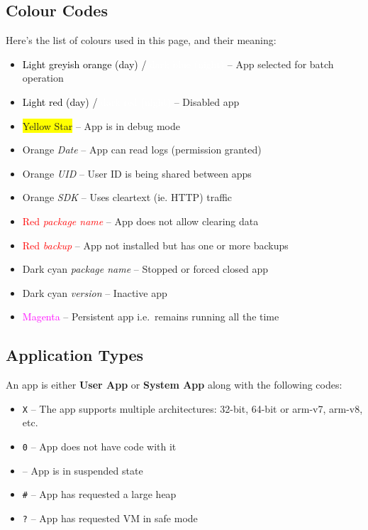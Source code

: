 \subsection{Colour Codes}\label{subsec:main-colour-codes}
Here's the list of colours used in this page, and their meaning:
\begin{itemize}
    \item \colorbox{AMLightGreyishOrange}{\textcolor{black}{Light greyish orange (day)}} / \colorbox{AMDarkBlue}{
        \textcolor{white}{dark blue (night)}} -- App selected for batch operation
    \item \colorbox{AMLightRed}{\textcolor{black}{Light red (day)}} / \colorbox{AMVeryDarkRed}{
        \textcolor{white}{dark red (night)}} -- Disabled app
    \item \colorbox{yellow}{Yellow Star} -- App is in debug mode
    \item \textcolor{AMOrange}{Orange \textit{Date}} -- App can read logs (permission granted)
    \item \textcolor{AMOrange}{Orange \textit{UID}} -- User ID is being shared between apps
    \item \textcolor{AMOrange}{Orange \textit{SDK}} -- Uses cleartext (ie. HTTP) traffic
    \item \textcolor{red}{Red \textit{package name}} -- App does not allow clearing data
    \item \textcolor{red}{Red \textit{backup}} -- App not installed but has one or more backups
    \item \textcolor{AMDarkCyan}{Dark cyan \textit{package name}} -- Stopped or forced closed app
    \item \textcolor{AMDarkCyan}{Dark cyan \textit{version}} -- Inactive app
    \item \textcolor{magenta}{Magenta} -- Persistent app i.e.\ remains running all the time
\end{itemize}

\subsection{Application Types}\label{subsec:main-page-application-types}
An app is either \textbf{User App} or \textbf{System App} along with the following codes:
\begin{itemize}
    \item \texttt{X} -- The app supports multiple architectures: 32-bit, 64-bit or arm-v7, arm-v8, etc.
    \item \texttt{0} -- App does not have code with it
    \item \texttt{\textdegree} -- App is in suspended state
    \item \texttt{\#} -- App has requested a large heap
    \item \texttt{?} -- App has requested VM in safe mode
\end{itemize}

